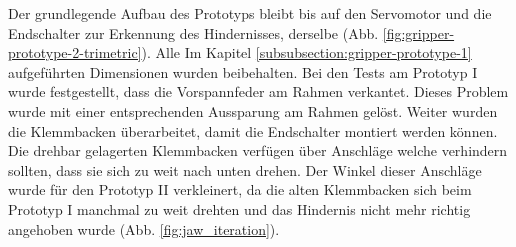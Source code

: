 Der grundlegende Aufbau des Prototyps bleibt bis auf den Servomotor und die Endschalter zur Erkennung des Hindernisses, derselbe (Abb. \ref{fig:gripper-prototype-2-trimetric}). Alle Im Kapitel \ref{subsubsection:gripper-prototype-1} aufgeführten Dimensionen wurden beibehalten. Bei den Tests am Prototyp I wurde festgestellt, dass die Vorspannfeder am Rahmen verkantet. Dieses Problem wurde mit einer entsprechenden Aussparung am Rahmen gelöst. Weiter wurden die Klemmbacken überarbeitet, damit die Endschalter montiert werden können. Die drehbar gelagerten Klemmbacken verfügen über Anschläge welche verhindern sollten, dass sie sich zu weit nach unten drehen. Der Winkel dieser Anschläge wurde für den Prototyp II verkleinert, da die alten Klemmbacken sich beim Prototyp I manchmal zu weit drehten und das Hindernis nicht mehr richtig angehoben wurde (Abb. \ref{fig:jaw_iteration}).

